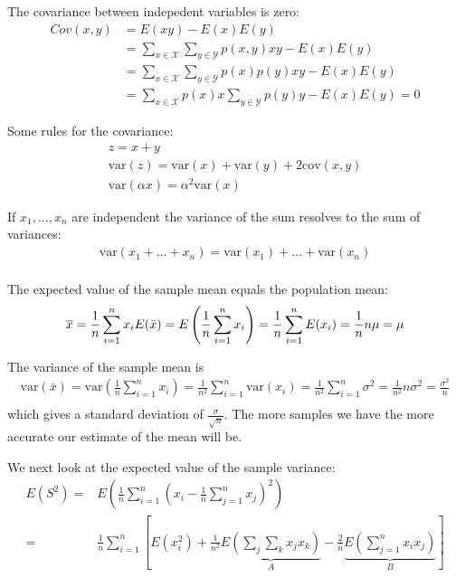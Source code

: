 The covariance between indepedent variables is zero:
\begin{align}
  Cov(x,y) &= E(xy)-E(x)E(y) \\
           &= \sum_{x\in \mathcal{X}}\sum_{y\in \mathcal{Y}}p(x,y)xy - E(x)E(y) \\
           &=\sum_{x\in \mathcal{X}}\sum_{y\in \mathcal{Y}} p(x)p(y)xy - E(x)E(y) \\
           &=\sum_{x\in \mathcal{X}}p(x)x\sum_{y\in \mathcal{Y}}p(y)y - E(x)E(y) = 0
\end{align}
    
Some rules for the covariance:
\begin{equation*}
  \begin{array}{l}
    z = x + y \\
    \text{var}(z) = \text{var}(x) + \text{var}(y) + 2 \text{cov}(x,y) \\
    \text{var}(\alpha x) = \alpha ^2 \text{var}(x)
  \end{array}
\end{equation*}

If $x_{1},\hdots,x_{n}$ are independent the variance of the sum resolves to the sum of variances:
\begin{align}
  \text{var}(x_{1} + \hdots + x_{n}) = \text{var}(x_{1}) + \hdots + \text{var}(x_{n})\\
\end{align}

The expected value of the sample mean equals the population mean:
\begin{align}
    \overline{x} = \frac{1}{n}\sum_{i=1}^{n} x_{i} 
    E(\bar{x}) = E\left(\frac{1}{n}\sum_{i=1}^{n}x_{i}\right)
    = \frac{1}{n}\sum_{i=1}^{n} E(x_{i}) 
    = \frac{1}{n}n\mu 
    = \mu
\end{align}

The variance of the sample mean is 
\begin{align}
    \text{var}(\bar{x}) = \text{var}\left(\frac{1}{n}\sum_{i=1}^{n}x_{i}\right)
    =\frac{1}{n^2}\sum_{i=1}^{n}\text{var}(x_{i}) 
    =\frac{1}{n^2}\sum_{i=1}^{n}\sigma^2
    = \frac{1}{n^2}n\sigma^2
    =\frac{\sigma^2}{n}\\    
\end{align}
which gives a standard deviation of $\frac{\sigma}{\sqrt{n}}$.
The more samples we have the more accurate our estimate of the mean will be.

We next look at the expected value of the sample variance:
\begin{align}
  E(S^2) =& E\left(\frac{1}{n}\sum_{i=1}^{n}\left(x_{i}-\frac{1}{n}\sum_{j=1}^{n}x_{j}\right)^2\right)\\
         =&\frac{1}{n}\sum_{i=1}^{n}\left[E(x_{i}^2)+\frac{1}{n^2}
         \underbrace{E\left(\sum_{j}\sum_{k}x_{j}x_{k}\right)}_{A}-
         \frac{2}{n} \underbrace{E\left(\sum_{j=1}^{n}x_{i}x_{j}\right)}_{B}\right]
\end{align}

